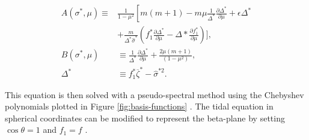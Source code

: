  \begin{equation}
   \begin{aligned} A\left(\sigma^{*}, \mu\right) \equiv & \frac{1}{1-\mu^{2}}\left[m(m+1)-m \mu \frac{1}{\Delta^{*}} \frac{\partial \Delta^{*}}{\partial \mu}+\epsilon \Delta^{*}\right.\\ &+\frac{m}{\Delta^{*} \hat{\sigma}^{*}}\left(f_{1}^{*} \frac{\partial \Delta^{*}}{\partial \mu}-\Delta * \frac{\partial f_{1}^{*}}{\partial \mu}\right) ], \\ B\left(\sigma^{*}, \mu\right) & \equiv \frac{1}{\Delta^{*}} \frac{\partial \Delta^{*}}{\partial \mu}+\frac{2 \mu(m+1)}{\left(1-\mu^{2}\right)}, \\ \Delta^{*} & \equiv f_{1}^{*} \overline{\zeta}^{*}-\hat{\sigma}^{* 2}. \end{aligned}
 \end{equation}

 This equation is then solved with a pseudo-spectral method using the Chebyshev polynomials plotted in Figure \ref{fig:basis-functions} \citep{wang2016hough}. The tidal equation in spherical coordinates can be modified to represent the beta-plane by setting $\cos \theta = 1$ and $f_{1} = f$ \citep{dunkerton1990laplace}.


